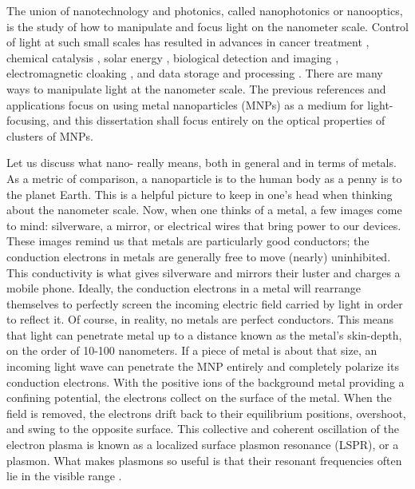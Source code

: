 \documentclass [11pt, proquest] {uwthesis}[2016/11/22]
\begin{document}
The union of nanotechnology and photonics, called nanophotonics or nanooptics, is the study of how to manipulate and focus light on the nanometer scale. Control of light at such small scales has resulted in advances in cancer treatment \cite{ElSayedCancer,LiuCancer}, chemical catalysis \cite{Halas2013,Camden2017}, solar energy \cite{Atwater2014,WuSolar}, biological detection and imaging \cite{vanDuyneSensing,Bezryadina2017}, electromagnetic cloaking \cite{AluCloaking,YeCloaking}, and data storage and processing \cite{MoloneyData,NaughtonData}. There are many ways to manipulate light at the nanometer scale. The previous references and applications focus on using metal nanoparticles (MNPs) as a medium for light-focusing, and this dissertation shall focus entirely on the optical properties of clusters of MNPs.

Let us discuss what nano- really means, both in general and in terms of metals. As a metric of comparison, a nanoparticle is to the human body as a penny is to the planet Earth. This is a helpful picture to keep in one's head when thinking about the nanometer scale. Now, when one thinks of a metal, a few images come to mind: silverware, a mirror, or electrical wires that bring power to our devices. These images remind us that metals are particularly good conductors; the conduction electrons in metals are generally free to move (nearly) uninhibited. This conductivity is what gives silverware and mirrors their luster and charges a mobile phone. Ideally, the conduction electrons in a metal will rearrange themselves to perfectly screen the incoming electric field carried by light in order to reflect it. Of course, in reality, no metals are perfect conductors. This means that light can penetrate metal up to a distance known as the metal's skin-depth, on the order of 10-100 nanometers. If a piece of metal is about that size, an incoming light wave can penetrate the MNP entirely and completely polarize its conduction electrons. With the positive ions of the background metal providing a confining potential, the electrons collect on the surface of the metal. When the field is removed, the electrons drift back to their equilibrium positions, overshoot, and swing to the opposite surface. This collective and coherent oscillation of the electron plasma is known as a localized surface plasmon resonance (LSPR), or a plasmon. What makes plasmons so useful is that their resonant frequencies often lie in the visible range \cite{KREIBIG1985}.
\end{document}
